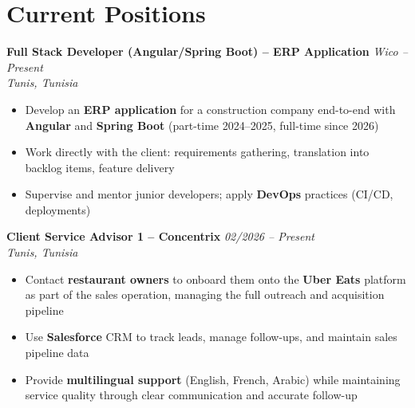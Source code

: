 \documentclass[10pt,a4paper]{article}
\begin{document}
\section*{Current Positions}
{\small
\textbf{Full Stack Developer (Angular/Spring Boot) -- ERP Application} \hfill \textit{Wico \;\textbar{} -- Present}\\[1pt]
\textit{Tunis, Tunisia}
\begin{itemize}
  \item Develop an \textbf{ERP application} for a construction company end-to-end with \textbf{Angular} and \textbf{Spring Boot} (part-time 2024--2025, full-time since 2026)
  \item Work directly with the client: requirements gathering, translation into backlog items, feature delivery
  \item Supervise and mentor junior developers; apply \textbf{DevOps} practices (CI/CD, deployments)
\end{itemize}

\vspace{4pt}
\textbf{Client Service Advisor 1 -- Concentrix} \hfill \textit{02/2026 -- Present}\\[1pt]
\textit{Tunis, Tunisia}
\begin{itemize}
  \item Contact \textbf{restaurant owners} to onboard them onto the \textbf{Uber Eats} platform as part of the sales operation, managing the full outreach and acquisition pipeline
  \item Use \textbf{Salesforce} CRM to track leads, manage follow-ups, and maintain sales pipeline data
  \item Provide \textbf{multilingual support} (English, French, Arabic) while maintaining service quality through clear communication and accurate follow-up
\end{itemize}
}

\end{document}
